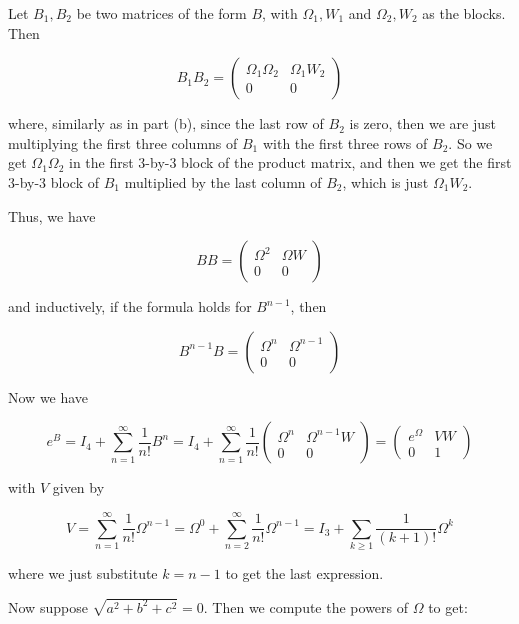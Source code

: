 \documentclass{article}
\begin{document}
Let $B_1, B_2$ be two matrices of the form $B$, with $\Omega_1,W_1$ and $\Omega_2,W_2$ as the blocks. Then

\[ B_1 B_2 = \left(\begin{array}{cc} \Omega_1 \Omega_2 & \Omega_1 W_2 \\ 0 & 0 \end{array}\right) \]

where, similarly as in part (b), since the last row of $B_2$ is zero, then we are just multiplying the first three columns of $B_1$ with the first three rows of $B_2$. So we get $\Omega_1 \Omega_2$ in the first 3-by-3 block of the product matrix, and then we get the first 3-by-3 block of $B_1$ multiplied by the last column of $B_2$, which is just $\Omega_1 W_2$.

Thus, we have 

\[ BB = \left( \begin{array}{cc} \Omega^2 & \Omega W \\ 0 & 0 \end{array}\right)\]

and inductively, if the formula holds for $B^{n-1}$, then

\[ B^{n-1} B = \left(\begin{array}{cc} \Omega^n & \Omega^{n-1} \\ 0 & 0 \end{array}\right) \]

Now we have 

\[ e^B = I_4 + \displaystyle\sum_{n=1}^{\infty} \dfrac{1}{n!} B^n = I_4 + \displaystyle\sum_{n=1}^{\infty} \dfrac{1}{n!} \left(\begin{array}{cc} \Omega^n & \Omega^{n-1}W \\ 0 & 0 \end{array}\right) = \left( \begin{array}{cc} e^{\Omega} & VW \\ 0 & 1 \end{array}\right)\]

with $V$ given by

\[V = \displaystyle\sum_{n=1}^{\infty} \dfrac{1}{n!} \Omega^{n-1} = \Omega^0  + \displaystyle\sum_{n=2}^{\infty} \dfrac{1}{n!} \Omega^{n-1} = I_3 + \displaystyle\sum_{k\ge 1} \dfrac{1}{(k+1)!} \Omega^k\]

where we just substitute $k=n-1$ to get the last expression. 

Now suppose $\sqrt{a^2 + b^2 + c^2} = 0$. Then we compute the powers of $\Omega$ to get: 
\end{document}
